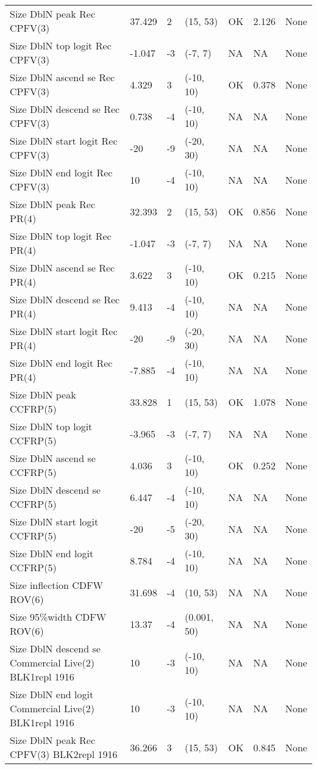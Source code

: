 \documentclass[11pt,
  letterpaper,
]{article}
\begin{document}
\begin{landscape}
\begin{longtable}[t]{>{\raggedright\arraybackslash}p{7.5cm}lllll>{\raggedright\arraybackslash}p{3.5cm}}
Size DblN peak Rec CPFV(3) & 37.429 & 2 & (15, 53) & OK & 2.126 & None\\
Size DblN top logit Rec CPFV(3) & -1.047 & -3 & (-7, 7) & NA & NA & None\\
Size DblN ascend se Rec CPFV(3) & 4.329 & 3 & (-10, 10) & OK & 0.378 & None\\
Size DblN descend se Rec CPFV(3) & 0.738 & -4 & (-10, 10) & NA & NA & None\\
Size DblN start logit Rec CPFV(3) & -20 & -9 & (-20, 30) & NA & NA & None\\
Size DblN end logit Rec CPFV(3) & 10 & -4 & (-10, 10) & NA & NA & None\\
Size DblN peak Rec PR(4) & 32.393 & 2 & (15, 53) & OK & 0.856 & None\\
Size DblN top logit Rec PR(4) & -1.047 & -3 & (-7, 7) & NA & NA & None\\
Size DblN ascend se Rec PR(4) & 3.622 & 3 & (-10, 10) & OK & 0.215 & None\\
Size DblN descend se Rec PR(4) & 9.413 & -4 & (-10, 10) & NA & NA & None\\
Size DblN start logit Rec PR(4) & -20 & -9 & (-20, 30) & NA & NA & None\\
Size DblN end logit Rec PR(4) & -7.885 & -4 & (-10, 10) & NA & NA & None\\
Size DblN peak CCFRP(5) & 33.828 & 1 & (15, 53) & OK & 1.078 & None\\
Size DblN top logit CCFRP(5) & -3.965 & -3 & (-7, 7) & NA & NA & None\\
Size DblN ascend se CCFRP(5) & 4.036 & 3 & (-10, 10) & OK & 0.252 & None\\
Size DblN descend se CCFRP(5) & 6.447 & -4 & (-10, 10) & NA & NA & None\\
Size DblN start logit CCFRP(5) & -20 & -5 & (-20, 30) & NA & NA & None\\
Size DblN end logit CCFRP(5) & 8.784 & -4 & (-10, 10) & NA & NA & None\\
Size inflection CDFW ROV(6) & 31.698 & -4 & (10, 53) & NA & NA & None\\
Size 95\%width CDFW ROV(6) & 13.37 & -4 & (0.001, 50) & NA & NA & None\\
Size DblN descend se Commercial Live(2) BLK1repl 1916 & 10 & -3 & (-10, 10) & NA & NA & None\\
Size DblN end logit Commercial Live(2) BLK1repl 1916 & 10 & -3 & (-10, 10) & NA & NA & None\\
Size DblN peak Rec CPFV(3) BLK2repl 1916 & 36.266 & 3 & (15, 53) & OK & 0.845 & None\\

\end{longtable}
\end{landscape}
\end{document}
